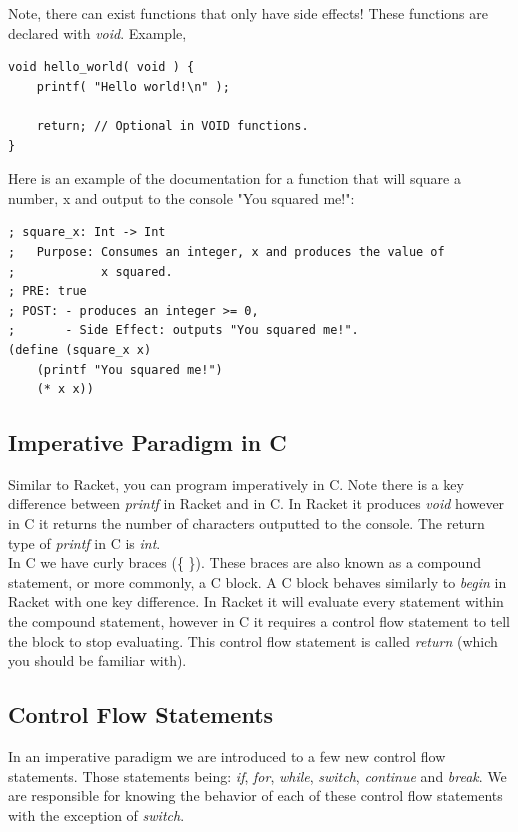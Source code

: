 \documentclass[12pt,extarticle]{article}
\begin{document}
Note, there can exist functions that only have side effects! These functions are declared with \emph{void}. Example,\\

\lstset {
	language=c
}
\begin{lstlisting}
void hello_world( void ) {
	printf( "Hello world!\n" );
	
	return; // Optional in VOID functions.
}
\end{lstlisting}

Here is an example of the documentation for a function that will square a number, x and output to the console "You squared me!":\\

\lstset {
	language=Lisp
}
\begin{lstlisting}
; square_x: Int -> Int
;	Purpose: Consumes an integer, x and produces the value of
;            x squared.
; PRE: true
; POST: - produces an integer >= 0,
;       - Side Effect: outputs "You squared me!".
(define (square_x x)
	(printf "You squared me!")
	(* x x))
\end{lstlisting}

\subsection{Imperative Paradigm in C}

Similar to Racket, you can program imperatively in C. Note there is a key difference between \emph{printf} in Racket and in C. In Racket it produces \emph{void} however in C it returns the number of characters outputted to the console. The return type of \emph{printf} in C is \emph{int}.\\

In C we have curly braces (\{ \}). These braces are also known as a compound statement, or more commonly, a C block. A C block behaves similarly to \emph{begin} in Racket with one key difference. In Racket it will evaluate every statement within the compound statement, however in C it requires a control flow statement to tell the block to stop evaluating. This control flow statement is called \emph{return} (which you should be familiar with).

\subsection{Control Flow Statements}

In an imperative paradigm we are introduced to a few new control flow statements. Those statements being: \emph{if}, \emph{for}, \emph{while}, \emph{switch}, \emph{continue} and \emph{break}. We are responsible for knowing the behavior of each of these control flow statements with the exception of \emph{switch}.\\
\end{document}
